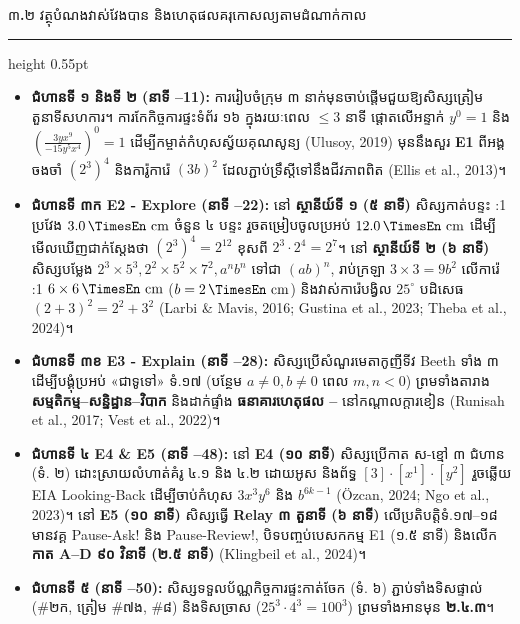 \documentclass[a4paper,12pt]{article}
\newcommand{\en}[1]{{\TimesEn #1}}
\newcommand{\enbf}[1]{{\TimesEn\textbf{#1}}}
\newcommand{\unit}[1]{\,\text{\en{#1}}}
\newcommand{\cnum}[1]{{\TimesEn\fontsize{10.5pt}{12pt}\selectfont\ding{\numexpr181+#1\relax}}}
\newcommand{\subsectitle}[1]{{\muol\fontsize{11.5pt}{18.5pt}\selectfont #1}}
\newcommand{\subsec}[1]{%
  \Needspace{1.7cm}%
  \vspace{3pt}%
  \subsectitle{#1}\par%
  \vspace{-2pt}%
  {\color{black}\hrule height 0.55pt}%
  \vspace{3pt}%
}
\begin{document}
\subsec{៣\enbf{.}២ វត្ថុបំណងវាស់វែងបាន និងហេតុផលគរុកោសល្យតាមដំណាក់កាល}

\begin{itemize}[leftmargin=0.65cm]
  \item \textbf{ជំហានទី ១ និងទី ២ (នាទី \en{00--11}):} ការរៀបចំក្រុម ៣ នាក់មុនចាប់ផ្ដើមជួយឱ្យសិស្សត្រៀមតួនាទីសហការ។ ការកែកិច្ចការផ្ទះទំព័រ ១៦ ក្នុងរយៈពេល $\le 3$ នាទី ផ្ដោតលើអន្ទាក់ $y^0=1$ និង $\left(\frac{3yx^9}{-15y^5x^4}\right)^0=1$ ដើម្បីកម្ចាត់កំហុសស្វ័យគុណសូន្យ (\en{Ulusoy, 2019}) មុននឹងសួរ \textbf{\en{E1}} ពីអង្គចងចាំ $(2^3)^4$ និងការ៉ូការ៉េ $(3b)^2$ ដែលភ្ជាប់ទ្រឹស្ដីទៅនឹងជីវភាពពិត (\en{Ellis et al., 2013})។
  \item \textbf{ជំហានទី ៣ក \en{E2 - Explore} (នាទី \en{11--22}):} នៅ \textbf{ស្ថានីយ៍ទី ១ (៥ នាទី)} សិស្សកាត់បន្ទះ \en{1:1} ប្រវែង $3.0\unit{cm}$ ចំនួន ៤ បន្ទះ រួចតម្រៀបចូលប្រអប់ $12.0\unit{cm}$ ដើម្បីមើលឃើញជាក់ស្ដែងថា $(2^3)^4 = 2^{12}$ ខុសពី $2^3\cdot 2^4 = 2^7$។ នៅ \textbf{ស្ថានីយ៍ទី ២ (៦ នាទី)} សិស្សបម្លែង $2^3\times 5^3, 2^2\times 5^2\times 7^2, a^nb^n$ ទៅជា $(ab)^n$, រាប់ក្រឡា $3\times 3 = 9b^2$ លើការ៉េ \en{1:1} $6\times 6\unit{cm}$ ($b=2\unit{cm}$) និងវាស់ការ៉េបង្វិល $25^\circ$ បដិសេធ $(2+3)^2 = 2^2+3^2$ (\en{Larbi \& Mavis, 2016; Gustina et al., 2023; Theba et al., 2024})។
  \item \textbf{ជំហានទី ៣ខ \en{E3 - Explain} (នាទី \en{22--28}):} សិស្សប្រើសំណួរមេតាកូញីទីវ \en{Beeth} ទាំង ៣ ដើម្បីបង្គុំប្រអប់ «ជាទូទៅ» ទំ.១៧ (បន្ថែម $a\neq 0, b\neq 0$ ពេល $m,n<0$) ព្រមទាំងតារាង \textbf{សម្មតិកម្ម--សន្និដ្ឋាន--វិបាក} និងដាក់ផ្ទាំង \textbf{ធនាគារហេតុផល \cnum{1}--\cnum{5}} នៅកណ្ដាលក្ដារខៀន (\en{Runisah et al., 2017; Vest et al., 2022})។
  \item \textbf{ជំហានទី ៤ \en{E4 \& E5} (នាទី \en{28--48}):} នៅ \textbf{\en{E4} (១០ នាទី)} សិស្សប្រើកាត ស-ខ្មៅ ៣ ជំហាន (ទំ. ២) ដោះស្រាយលំហាត់គំរូ ៤.១ និង ៤.២ ដោយអូស \en{[tracing]} និងព័ទ្ធ $[3]\cdot[x^1]\cdot[y^2]$ រួចឆ្លើយ \en{EIA Looking-Back} ដើម្បីចាប់កំហុស $3x^3y^6$ និង $b^{6k-1}$ (\en{Özcan, 2024; Ngo et al., 2023})។ នៅ \textbf{\en{E5} (១០ នាទី)} សិស្សធ្វើ \textbf{Relay ៣ តួនាទី (៦ នាទី)} លើប្រតិបត្តិទំ.១៧--១៨ មានវគ្គ \en{Pause-Ask!} និង \en{Pause-Review!}, បិទបញ្ចប់បេសកកម្ម \en{E1} (១.៥ នាទី) និងលើក \textbf{កាត \en{A--D} ៩០ វិនាទី (២.៥ នាទី)} (\en{Klingbeil et al., 2024})។
  \item \textbf{ជំហានទី ៥ (នាទី \en{48--50}):} សិស្សទទួលប័ណ្ណកិច្ចការផ្ទះកាត់ចែក (ទំ. ៦) ភ្ជាប់ទាំងទិសផ្ទាល់ (\#២ក, ត្រៀម \#៧ង, \#៨) និងទិសច្រាស ($25^3\cdot 4^3 = 100^3$) ព្រមទាំងអានមុន \textbf{២.៤.៣}។
\end{itemize}
\end{document}
